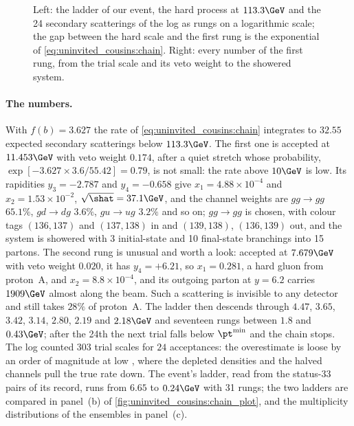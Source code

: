 \begin{figure}[htbp]\centering
\resizebox{\textwidth}{!}{}
\caption[The ladder of secondary scatterings and the first rung worked
out]{Left: the \pt ladder of our event, the hard process at $113.3\GeV$ and
the 24 secondary scatterings of the  log as rungs on a logarithmic
scale; the gap between the hard scale and the first rung is the exponential
of \cref{eq:uninvited_cousins:chain}. Right: every number of the first rung,
from the trial scale and its veto weight to the showered system.}
\label{fig:uninvited_cousins:chain_sketch}
\end{figure}

\paragraph{The numbers.} With $f(b)=3.627$ the rate of
\cref{eq:uninvited_cousins:chain} integrates to $32.55$ expected secondary
scatterings below $113.3\GeV$. The first one is accepted at $11.453\GeV$
with veto weight $0.174$, after a quiet stretch whose probability,
$\exp[-3.627\times3.6/55.42]=0.79$, is not small: the rate above $10\GeV$ is
low. Its rapidities $y_3=-2.787$ and $y_4=-0.658$ give
$x_1=4.88\times10^{-4}$ and $x_2=1.53\times10^{-2}$, $\sqrt{\shat}=37.1\GeV$,
and the channel weights are $gg\to gg$ $65.1\%$, $gd\to dg$ $3.6\%$, $gu\to
ug$ $3.2\%$ and so on; $gg\to gg$ is chosen, with colour tags $(136,137)$
and $(137,138)$ in and $(139,138)$, $(136,139)$ out, and the system is
showered with 3 initial-state and 10 final-state branchings into 15 partons.
The second rung is unusual and worth a look: accepted at $7.679\GeV$ with
veto weight $0.020$, it has $y_4=+6.21$, so $x_1=0.281$, a hard gluon from
proton~A, and $x_2=8.8\times10^{-4}$, and its outgoing parton at $y=6.2$
carries $1909\GeV$ almost along the beam. Such a scattering is invisible to
any detector and still takes $28\%$ of proton~A. The ladder then descends
through $4.47$, $3.65$, $3.42$, $3.14$, $2.80$, $2.19$ and $2.18\GeV$ and
seventeen rungs between $1.8$ and $0.43\GeV$; after the 24th the next
trial falls below $\pt^{\min}$ and the chain stops. The log counted $303$
trial scales for $24$ acceptances: the overestimate is loose by an order
of magnitude at low \pt, where the depleted densities and the halved
channels pull the true rate down. The \CMSSW event's ladder, read from the
status-33 pairs of its record, runs from $6.65$ to $0.24\GeV$ with 31
rungs; the two ladders are compared in panel~(b) of
\cref{fig:uninvited_cousins:chain_plot}, and the multiplicity distributions
of the ensembles in panel~(c).

